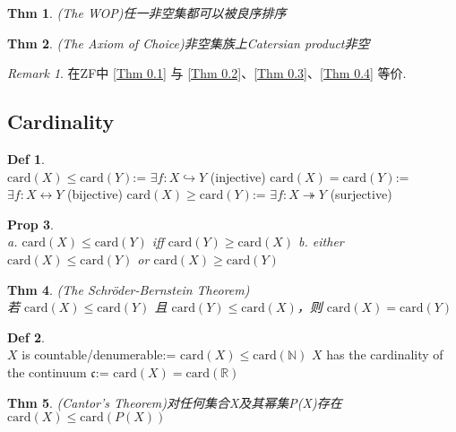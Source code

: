 \documentclass[hidelinks]{article}
\theoremstyle{definition}
\newtheorem*{defin}{Def}
\theoremstyle{plain}
\newtheorem{theorem}{Thm}[section]
\newtheorem{proposition}[theorem]{Prop}
\theoremstyle{remark}
\newtheorem*{remark}{Remark}
\begin{document}
\begin{theorem}(The WOP)\label{Thm 0.3}
任一非空集都可以被良序排序
\end{theorem}
\begin{theorem}(The Axiom of Choice)\label{Thm 0.4}
非空集族上Catersian product非空
\end{theorem}

\begin{remark}
在ZF中 \autoref{Thm 0.1} 与 \autoref{Thm 0.2}、\autoref{Thm 0.3}、\autoref{Thm 0.4} 等价.
\end{remark}

\subsection{Cardinality}
\begin{defin}~\\
$\mathrm{card}(X)\leq \mathrm{card}(Y)$:= $\exists f: X\hookrightarrow Y$ (injective) \newline
$\mathrm{card}(X)=\mathrm{card}(Y)$:= $\exists f: X\leftrightarrow Y$ (bijective) \newline
$\mathrm{card}(X)\geq \mathrm{card}(Y)$:= $\exists f: X\twoheadrightarrow Y$ (surjective)
\end{defin}

\begin{proposition}~\\
a. $\mathrm{card}(X)\leq \mathrm{card}(Y)$ iff $\mathrm{card}(Y)\geq \mathrm{card}(X)$ \newline
b. either $\mathrm{card}(X)\leq \mathrm{card}(Y)$ or $\mathrm{card}(X)\geq \mathrm{card}(Y)$
\end{proposition}
\begin{theorem}(The Schröder-Bernstein Theorem)~\\
若 $\mathrm{card}(X)\leq \mathrm{card}(Y)$ 且 $\mathrm{card}(Y)\leq \mathrm{card}(X)$，则 $\mathrm{card}(X)=\mathrm{card}(Y)$
\end{theorem}

\begin{defin}~\\
$X$ is countable/denumerable:= $\mathrm{card}(X)\leq \mathrm{card}(\mathbb{N})$ \newline
$X$ has the cardinality of the continuum $\mathfrak{c}$:= $\mathrm{card}(X)=\mathrm{card}(\mathbb{R})$
\end{defin}

\begin{theorem}(Cantor's Theorem)\label{Thm 0.7}
对任何集合X及其幂集P(X)存在$\mathrm{card}(X)\leq \mathrm{card}(P(X))$
\end{theorem}
\end{document}

